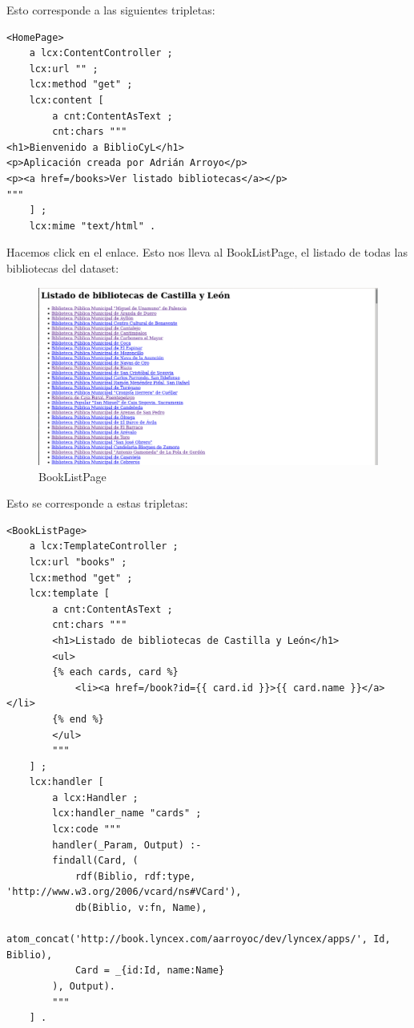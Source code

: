 \documentclass[12pt]{report} %
\begin{document}
Esto corresponde a las siguientes tripletas:
\begin{lstlisting}
<HomePage>
    a lcx:ContentController ;
    lcx:url "" ;
    lcx:method "get" ;
    lcx:content [
        a cnt:ContentAsText ;
        cnt:chars """
<h1>Bienvenido a BiblioCyL</h1>
<p>Aplicación creada por Adrián Arroyo</p>
<p><a href=/books>Ver listado bibliotecas</a></p>
"""
    ] ;
    lcx:mime "text/html" .
\end{lstlisting}

Hacemos click en el enlace. Esto nos lleva al BookListPage, el listado de todas las bibliotecas del dataset:

\begin{figure}
    \centering
    \includegraphics[width=\textwidth]{tour/bibliocyl2.png}
    \caption{BookListPage}
    \label{fig:bibliocyl2}
\end{figure}

Esto se corresponde a estas tripletas:
\begin{lstlisting}
<BookListPage>
    a lcx:TemplateController ;
    lcx:url "books" ;
    lcx:method "get" ;
    lcx:template [
        a cnt:ContentAsText ;
        cnt:chars """
        <h1>Listado de bibliotecas de Castilla y León</h1>
        <ul>
        {% each cards, card %}
            <li><a href=/book?id={{ card.id }}>{{ card.name }}</a></li>
        {% end %}
        </ul>
        """
    ] ;
    lcx:handler [
        a lcx:Handler ;
        lcx:handler_name "cards" ;
        lcx:code """
        handler(_Param, Output) :-
        findall(Card, (
            rdf(Biblio, rdf:type, 'http://www.w3.org/2006/vcard/ns#VCard'),
            db(Biblio, v:fn, Name),
            atom_concat('http://book.lyncex.com/aarroyoc/dev/lyncex/apps/', Id, Biblio),
            Card = _{id:Id, name:Name}
        ), Output).
        """
    ] .
\end{lstlisting}
\end{document}
